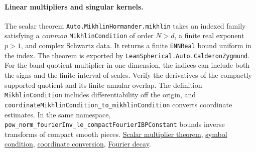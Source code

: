 \documentclass[11pt,letterpaper]{article}
\theoremstyle{definition}
\begin{document}
\paragraph{Linear multipliers and singular kernels.}
The scalar theorem \nolinkurl{Auto.MikhlinHormander.mikhlin} takes an indexed family satisfying a \emph{common} \nolinkurl{MikhlinCondition} of order \(N>d\), a finite real exponent \(p>1\), and complex Schwartz data. It returns a finite \nolinkurl{ENNReal} bound uniform in the index. The theorem is exported by \nolinkurl{LeanSpherical.Auto.CalderonZygmund}. For the band-quotient multiplier in one dimension, the indices can include both the signs and the finite interval of scales. Verify the derivatives of the compactly supported quotient and its finite annular overlap. The definition \nolinkurl{MikhlinCondition} includes differentiability off the origin, and \nolinkurl{coordinateMikhlinCondition_to_mikhlinCondition} converts coordinate estimates. In the same namespace, \nolinkurl{pow_norm_fourierInv_le_compactFourierIBPConstant} bounds inverse transforms of compact smooth pieces. \href{https://github.com/roos-j/lean-spherical/blob/800b71afca91e42809c21e6e2fd9ae4f82467082/LeanSpherical/Auto/CalderonZygmund.lean#L5192}{Scalar multiplier theorem}, \href{https://github.com/roos-j/lean-spherical/blob/800b71afca91e42809c21e6e2fd9ae4f82467082/LeanSpherical/Auto/MikhlinHormander.lean#L71}{symbol condition}, \href{https://github.com/roos-j/lean-spherical/blob/800b71afca91e42809c21e6e2fd9ae4f82467082/LeanSpherical/Auto/MikhlinHormander.lean#L152}{coordinate conversion}, \href{https://github.com/roos-j/lean-spherical/blob/800b71afca91e42809c21e6e2fd9ae4f82467082/LeanSpherical/Auto/MikhlinHormander.lean#L581}{Fourier decay}.
\end{document}
